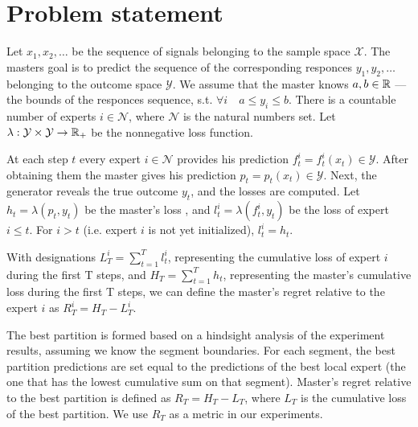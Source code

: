 \documentclass[12pt, twoside]{article}
\begin{document}
\section{Problem statement}
Let $x_1, x_2, \dots$ be the sequence of signals belonging to the sample space  $\mathcal{X}$. 
The masters goal is to predict the sequence of the corresponding responces $y_1, y_2, \dots$ belonging to the outcome space $\mathcal{Y}$. 
We assume that the master knows $a, b \in \mathbb{R}$ --- the bounds of the responces sequence, s.t. $\forall i\quad a \leq y_i \leq b$.
There is a countable number of experts $i \in \mathcal{N}$, where $\mathcal{N}$ is the natural numbers set. 
Let $ \lambda: \mathcal{Y} \times \mathcal{Y} \rightarrow \RR_+$ be the nonnegative loss function. 

At each step $t$ every expert $i \in \mathcal{N}$ provides his prediction $f_t^i = f_t^i(x_t)  \in \mathcal{Y}$. 
After obtaining them the master gives his prediction $p_t = p_t(x_t) \in \mathcal{Y}$. 
Next, the generator reveals the true outcome $y_t$, and the losses are computed.
Let $h_t = \lambda(p_t, y_t)$ be the master's loss , and $l_t^i = \lambda(f_t^i, y_t)$ be the loss of expert $i \le t$. For $i > t$ (i.e. expert $i$ is not yet initialized), $l_t^i = h_t$.

With designations $L_T^i = \sum_{t = 1}^T l_t^i$, representing the cumulative loss of expert $i$ during the first T steps, and $H_T = \sum_{t = 1}^T h_t$, 
representing the master's cumulative loss during the first T steps, we can define the master's regret relative to the expert $i$ as $R^i_T = H_T - L^i_T$. 

The best partition is formed based on a hindsight analysis of the experiment results, assuming we know the segment boundaries. For each segment, the best partition predictions are set equal to the predictions of the best local expert (the one that has the lowest cumulative sum on that segment). Master's regret relative to the best partition is defined as $R_T= H_T - L_T$, where $L_T$ is the cumulative loss of the best partition. We use $R_T$ as a metric in our experiments.

 
\vspace{5mm}
\end{document}
